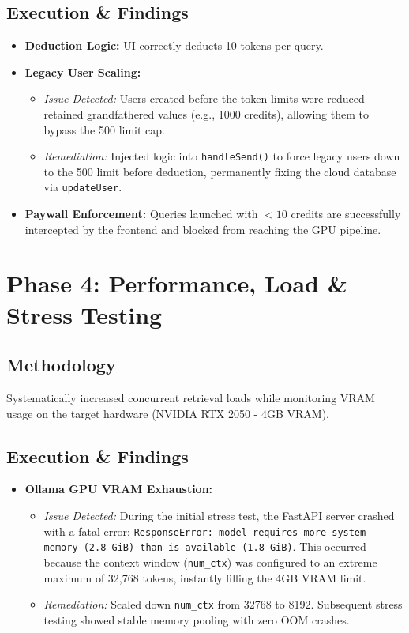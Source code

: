 \documentclass[11pt, a4paper]{article}
\begin{document}
\subsection{Execution \& Findings}
\begin{itemize}
    \item \textbf{Deduction Logic:} UI correctly deducts 10 tokens per query.
    \item \textbf{Legacy User Scaling:}
    \begin{itemize}
        \item \textit{Issue Detected:} Users created before the token limits were reduced retained grandfathered values (e.g., 1000 credits), allowing them to bypass the 500 limit cap.
        \item \textit{Remediation:} Injected logic into \texttt{handleSend()} to force legacy users down to the 500 limit before deduction, permanently fixing the cloud database via \texttt{updateUser}.
    \end{itemize}
    \item \textbf{Paywall Enforcement:} Queries launched with $< 10$ credits are successfully intercepted by the frontend and blocked from reaching the GPU pipeline.
\end{itemize}

\section{Phase 4: Performance, Load \& Stress Testing}
\subsection{Methodology}
Systematically increased concurrent retrieval loads while monitoring VRAM usage on the target hardware (NVIDIA RTX 2050 - 4GB VRAM).

\subsection{Execution \& Findings}
\begin{itemize}
    \item \textbf{Ollama GPU VRAM Exhaustion:}
    \begin{itemize}
        \item \textit{Issue Detected:} During the initial stress test, the FastAPI server crashed with a fatal error: \texttt{ResponseError: model requires more system memory (2.8 GiB) than is available (1.8 GiB)}. This occurred because the context window (\texttt{num\_ctx}) was configured to an extreme maximum of 32,768 tokens, instantly filling the 4GB VRAM limit.
        \item \textit{Remediation:} Scaled down \texttt{num\_ctx} from 32768 to 8192. Subsequent stress testing showed stable memory pooling with zero OOM crashes.
    \end{itemize}
\end{itemize}
\end{document}
